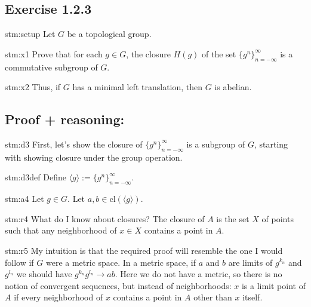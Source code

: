 \subsection*{Exercise 1.2.3}

\begin{exercise}{stm:setup}
Let $G$ be a topological group.  
\end{exercise}

\begin{exercise}{stm:x1}
Prove that for each $g \in G$, the closure $H(g)$ of the set $\{g^n\}_{n=-\infty}^\infty$ is a commutative subgroup of $G$.
\end{exercise}

\begin{exercise}{stm:x2}
Thus, if $G$ has a minimal left translation, then $G$ is abelian.
\end{exercise}

\subsection*{Proof {\color{blue} + reasoning}:}

\begin{explanation}{stm:d3}
First, let's show the closure of $\{g^n\}_{n=-\infty}^\infty$ is a subgroup of $G$, starting with showing closure under the group operation.
\end{explanation}

\begin{statement}{stm:d3def}
Define ${\langle g \rangle} := \{g^n\}_{n=-\infty}^\infty$.
\end{statement}

\begin{statement}{stm:a4}
Let $g \in G$. Let $a, b \in \mathrm{cl}({\langle g \rangle})$.
\end{statement}

\begin{explanation}{stm:r4}
What do I know about closures? The closure of $A$ is the set $X$ of points such that any neighborhood of $x \in X$ contains a point in $A$.
\end{explanation}

\begin{explanation}{stm:r5}
My intuition is that the required proof will resemble the one I would follow if $G$ were a metric space. In a metric space, if $a$ and $b$ are limits of $g^{k_n}$ and $g^{l_n}$ we should have $g^{k_n} g^{l_n} \to ab$. Here we do not have a metric, so there is no notion of convergent sequences, but instead of neighborhoods: $x$ is a limit point of $A$ if every neighborhood of $x$ contains a point in $A$ other than $x$ itself.
\end{explanation}

